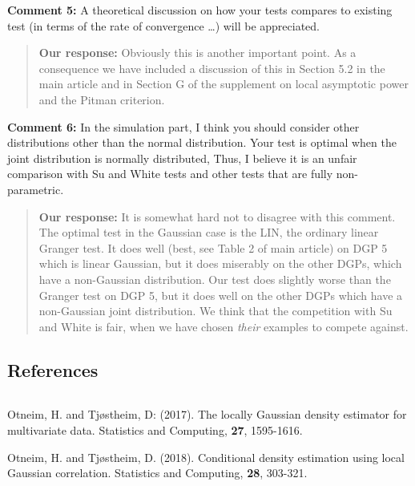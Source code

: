 \documentclass[
  12pt,
  letterpaper]{article}
\numberwithin{equation}{section}
\begin{document}
\textbf{Comment 5:} A theoretical discussion on how your tests compares to existing test (in terms of the rate of convergence \ldots) will be appreciated.

\begin{quote}
\textbf{Our response:} Obviously this is another important point. As a consequence we have included a discussion of this in Section 5.2 in the main article and in Section G of the supplement on local asymptotic power and the Pitman criterion.
\end{quote}

\textbf{Comment 6:} In the simulation part, I think you should consider other distributions other than the normal distribution. Your test is optimal when the joint distribution is normally distributed, Thus, I believe it is an unfair comparison with Su and White tests and other tests that are fully non-parametric.

\begin{quote}
\textbf{Our response:} It is somewhat hard not to disagree with this comment. The optimal test in the Gaussian case is the LIN, the ordinary linear Granger test. It does well (best, see Table 2 of main article) on DGP 5 which is linear Gaussian, but it does miserably on the other DGPs, which have a non-Gaussian distribution. Our test does slightly worse than the Granger test on DGP 5, but it does well on the other DGPs which have a non-Gaussian joint distribution. We think that the competition with Su and White is fair, when we have chosen \emph{their} examples to compete against.
\end{quote}

\hypertarget{references}{%
\subsection{References}\label{references}}

\({ }\)

Otneim, H. and Tjøstheim, D: (2017). The locally Gaussian density estimator for multivariate data. Statistics and Computing, \textbf{27}, 1595-1616.

Otneim, H. and Tjøstheim, D. (2018). Conditional density estimation using local Gaussian correlation. Statistics and Computing, \textbf{28}, 303-321.
\end{document}
